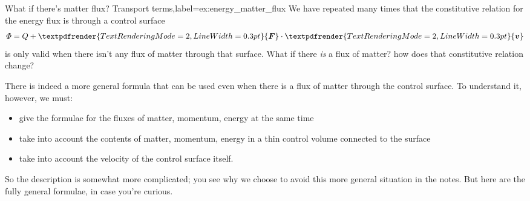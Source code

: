 \documentclass[a4paper,12pt,%
onecolumn,oneside,titlepage,%
british%
]{memoir}
\renewcommand*{\bm}[1]{\textpdfrender{TextRenderingMode=2,LineWidth=0.3pt}{\boldsymbol{#1}}}
\renewcommand*{\|}[1][]{\nonscript\:#1\vert\nonscript\:\mathopen{}}
\newcommand*{\yv}{\bm{v}}
\newcommand*{\yH}{\varPhi}%
\newcommand*{\yQ}{Q}%
\newcommand*{\yF}{\bm{F}}
\begin{document}
\begin{extra}{What if there's matter flux? Transport terms,label={ex:energy_matter_flux}}
  We have repeated many times that the constitutive relation for the energy flux is through a control surface
  \begin{equation*}
    \yH = \yQ + \yF\cdot\yv
  \end{equation*}
  is only valid when there isn't any flux of matter through that surface. What if there \emph{is} a flux of matter? how does that constitutive relation change?

  There is indeed a more general formula that can be used even when there is a flux of matter through the control surface. To understand it, however, we must:
  \begin{itemize}[shift,nosep]
  \item give the formulae for the fluxes of matter, momentum, energy at the same time
  \item take into account the contents of matter, momentum, energy in a thin control volume connected to the surface
  \item take into account the velocity of the control surface itself.
  \end{itemize}
So the description is somewhat more complicated; you see why we choose to avoid this more general situation in the notes. But here are the fully general formulae, in case you're curious.


\end{extra}
\end{document}
